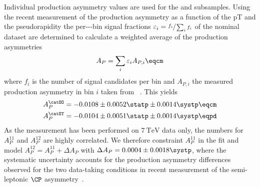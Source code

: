 Individual production asymmetry values are used for the \catOO and \catOT
subsamples. Using the recent \LHCb measurement \cite{Aaij:2014bba} of the
production asymmetry as a function of the \acf{pT} and the \acf{pseudorapidity}
the per-\pT-\pseudorapidity-bin signal fractions $\varepsilon_i =
\sfrac{f_i}{\sum_i f_i}$ of the nominal dataset are determined to calculate a
weighted average of the production asymmetries
%
\begin{equation}
  A_P = \sum_i \varepsilon_i A_{P,i}\eqcm
\end{equation}
where $f_i$ is the number of signal candidates per bin and $A_{P,i}$ the
measured production asymmetry in bin $i$ taken from \Ref~\cite{Aaij:2014bba}.
This yields
%
\begin{equation}
  \begin{split}
    A_P^{\catOO} &= -0.0108 \pm 0.0052 \statp \pm 0.0014 \systp \eqcm \\
    A_P^{\catOT} &= -0.0104 \pm 0.0051 \statp \pm 0.0014 \systp \eqpd \\
  \end{split}
\end{equation}
%
As the measurement has been performed on $\SI{7}{\TeV}$ data only, the numbers for
$A_P^{11}$ and $A_P^{12}$ are highly correlated. We therefore
constraint $A_P^{11}$ in the fit and model $A_P^{12} = A_P^{11} +
\Delta A_P$ with $\Delta A_P = 0.0004 \pm 0.0018 \systp$, where
the systematic uncertainty accounts for the production asymmetry differences
observed for the two data-taking conditions in  recent measurement of
the semi-leptonic $\CP$ asymmetry~\cite{Aaij:2014nxa}.
%
